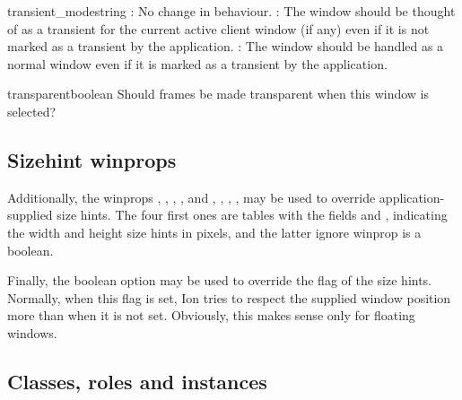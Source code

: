         
\begin{winprop}{transient_mode}{string}
    : No change in behaviour. :
    The window should be thought of as a transient for the current
    active client window (if any) even if it is not marked as a
    transient by the application. : The window should 
    be handled as a normal window even if it is marked as a
    transient by the application. 
\end{winprop}


\begin{winprop}{transparent}{boolean}
    Should frames be made transparent when this window is selected? \\
\end{winprop}


\subsection{Sizehint winprops}

Additionally, the winprops 
,
,
,
,
and
,
,
,
,
may be used to override application-supplied size hints. The four
first ones are tables with the fields  and , indicating
the width and height size hints in pixels, and the latter ignore
winprop is a boolean. 

Finally, the boolean
 option may be used to
override the  flag of the size hints. Normally,
when this flag is set, Ion tries to respect the supplied window
position more than when it is not set. Obviously, this makes sense
only for floating windows.


\subsection{Classes, roles and instances}
\label{sec:classesrolesinstances}

